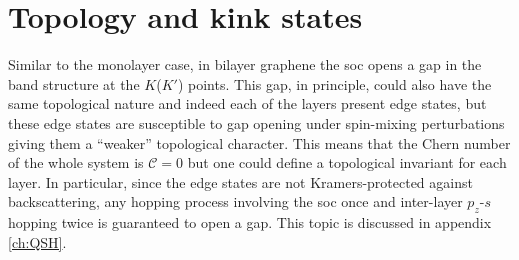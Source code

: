 


\section{Topology and kink states}
Similar to the monolayer case, in bilayer graphene the \ac{soc} opens a gap in the band structure at the $K$($K'$) points. This gap, in principle, could also have the same topological nature and indeed each of the layers present edge states, but these edge states are susceptible to gap opening under spin-mixing perturbations\cite{Prada2011} giving them a ``weaker'' topological character. This means that the Chern number of the whole system is $\mathcal{C}=0$ but one could define a topological invariant for each layer. In particular, since the edge states are not Kramers-protected against backscattering, any hopping process involving the \ac{soc} once and inter-layer $p_z$-$s$ hopping twice is guaranteed to open a gap. This topic is discussed in appendix \ref{ch:QSH}.
\smallskip


